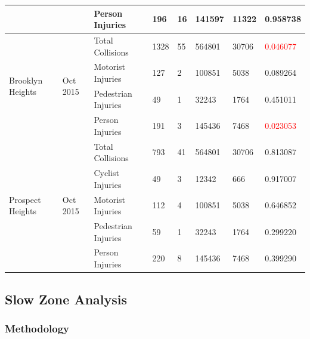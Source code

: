 \documentclass[10pt,journal,compsoc]{IEEEtran}
\begin{document}
\begin{table}[]
\begin{tabular}{|l|l|l|l|l|l|l|l|}
                                            &                             & Person Injuries     & 196       & 16       & 141597     & 11322     & 0.958738 \\ \hline
\multirow{4}{*}{Brooklyn Heights}           & \multirow{4}{*}{Oct 2015} & Total Collisions    & 1328      & 55       & 564801     & 30706     & \textcolor{red}{0.046077} \\ \cline{3-8} 
                                            &                             & Motorist Injuries   & 127       & 2        & 100851     & 5038      & 0.089264 \\ \cline{3-8} 
                                            &                             & Pedestrian Injuries & 49        & 1        & 32243      & 1764      & 0.451011 \\ \cline{3-8} 
                                            &                             & Person Injuries     & 191       & 3        & 145436     & 7468      & \textcolor{red}{0.023053} \\ \hline
\multirow{5}{*}{Prospect Heights}           & \multirow{5}{*}{Oct 2015} & Total Collisions    & 793       & 41       & 564801     & 30706     & 0.813087 \\ \cline{3-8} 
                                            &                             & Cyclist Injuries    & 49        & 3        & 12342      & 666       & 0.917007 \\ \cline{3-8} 
                                            &                             & Motorist Injuries   & 112       & 4        & 100851     & 5038      & 0.646852 \\ \cline{3-8} 
                                            &                             & Pedestrian Injuries & 59        & 1        & 32243      & 1764      & 0.299220 \\ \cline{3-8} 
                                            &                             & Person Injuries     & 220       & 8        & 145436     & 7468      & 0.399290 \\ \hline
\end{tabular}
\end{table}



\subsection{Slow Zone Analysis}

\subsubsection{Methodology}
\end{document}
